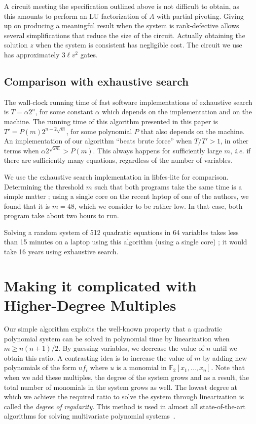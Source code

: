 \documentclass[a4paper,UKenglish,cleveref, autoref]{lipics-v2019}
\begin{document}
A circuit meeting the specification outlined above is not difficult to obtain,
as this amounts to perform an LU factorization of $A$ with partial
pivoting. Giving up on producing a meaningful result when the system is
rank-defective allows several simplifications that reduce the size of the
circuit. Actually obtaining the solution $z$ when the system is consistent has
negligible cost. The circuit we use has approximately $3\ell v^2$ gates.


\subsection{Comparison with exhaustive search}

The wall-clock running time of fast software implementations of exhaustive
search is $T = \alpha 2^n$, for some constant $\alpha$ which depends on the
implementation and on the machine. The running time of this algorithm presented
in this paper is $T' = P(m) 2^{n - 2\sqrt{m}}$, for some polynomial $P$ that
also depends on the machine. An implementation of our algorithm ``beats brute
force'' when $T/T' > 1$, in other terms when
$\alpha 2^{\sqrt{2m}} > P(m)$. This always happens for sufficiently large
$m$, \textit{i.e.} if there are sufficiently many equations, regardless of the
number of variables.

We use the exhaustive search implementation in \textsf{libfes-lite} for
comparison. Determining the threshold $m$ such that both programs take the same
time is a simple matter ; using a single core on the recent laptop of one of the
authors, we found that it is $m=48$, which we consider to be rather low. In that
case, both program take about two hours to run.

Solving a random system of 512 quadratic equations in 64 variables takes less
than 15 minutes on a laptop using this algorithm (using a single core) ; it
would take 16 years using exhaustive search.


\section{Making it complicated with Higher-Degree Multiples}
\label{sec:extensions}


Our simple algorithm exploits the well-known property that a quadratic polynomial system can be solved in polynomial time by linearization when $m \geq n(n+1)/2$.
By guessing variables, we decrease the value of $n$ until we obtain this ratio. A contrasting idea is to increase the value of $m$ by adding new polynomials of the form $uf_i$ where $u$ is a monomial in $\mathbb{F}_2[x_1, \dots, x_n]$.
Note that when we add these multiples, the degree of the system grows and as a result, the total number of monomials in the system grows as well. The lowest degree at which we achieve the required ratio to solve the system through linearization is called the \textit{degree of regularity}. This method is used in almost all state-of-the-art algorithms for solving multivariate polynomial systems~\cite{F4,F5,CourtoisKPS00,BardetFSS13,JouxV17}. 
\end{document}
